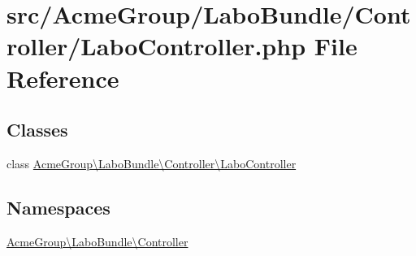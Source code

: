 \hypertarget{_labo_controller_8php}{\section{src/\+Acme\+Group/\+Labo\+Bundle/\+Controller/\+Labo\+Controller.php File Reference}
\label{_labo_controller_8php}
}
\subsection*{Classes}
\begin{DoxyCompactItemize}
\item 
class \hyperlink{class_acme_group_1_1_labo_bundle_1_1_controller_1_1_labo_controller}{Acme\+Group\textbackslash{}\+Labo\+Bundle\textbackslash{}\+Controller\textbackslash{}\+Labo\+Controller}
\end{DoxyCompactItemize}
\subsection*{Namespaces}
\begin{DoxyCompactItemize}
\item 
 \hyperlink{namespace_acme_group_1_1_labo_bundle_1_1_controller}{Acme\+Group\textbackslash{}\+Labo\+Bundle\textbackslash{}\+Controller}
\end{DoxyCompactItemize}
